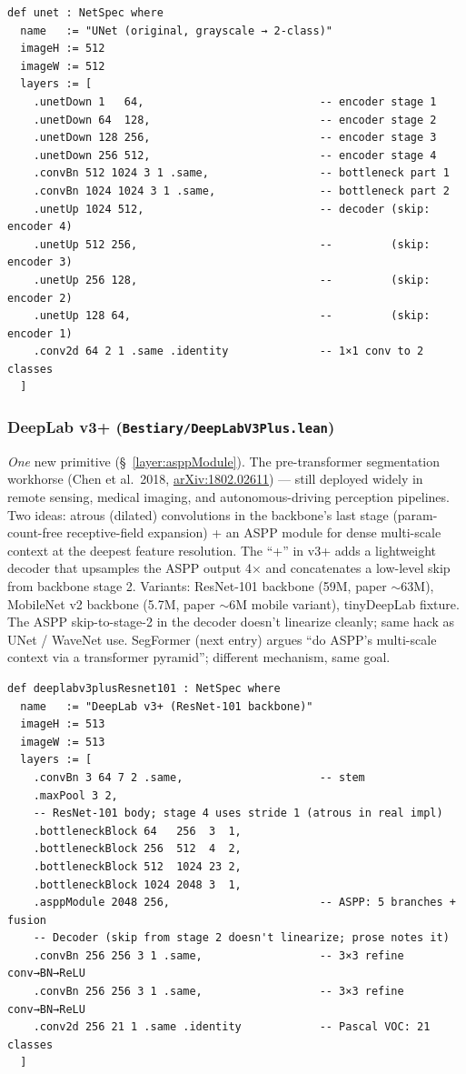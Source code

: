 \begin{verbatim}
def unet : NetSpec where
  name   := "UNet (original, grayscale → 2-class)"
  imageH := 512
  imageW := 512
  layers := [
    .unetDown 1   64,                           -- encoder stage 1
    .unetDown 64  128,                          -- encoder stage 2
    .unetDown 128 256,                          -- encoder stage 3
    .unetDown 256 512,                          -- encoder stage 4
    .convBn 512 1024 3 1 .same,                 -- bottleneck part 1
    .convBn 1024 1024 3 1 .same,                -- bottleneck part 2
    .unetUp 1024 512,                           -- decoder (skip: encoder 4)
    .unetUp 512 256,                            --         (skip: encoder 3)
    .unetUp 256 128,                            --         (skip: encoder 2)
    .unetUp 128 64,                             --         (skip: encoder 1)
    .conv2d 64 2 1 .same .identity              -- 1×1 conv to 2 classes
  ]
\end{verbatim}

\subsubsection*{DeepLab v3+ (\texttt{Bestiary/DeepLabV3Plus.lean})}
\emph{One} new primitive (\S~\ref{layer:asppModule}). The pre-transformer segmentation
workhorse (Chen et al.\ 2018,
\href{https://arxiv.org/abs/1802.02611}{arXiv:1802.02611}) --- still deployed widely in remote
sensing, medical imaging, and autonomous-driving perception
pipelines. Two ideas: atrous (dilated) convolutions in the
backbone's last stage (param-count-free receptive-field expansion)
+ an ASPP module for dense multi-scale context at the deepest
feature resolution. The ``+'' in v3+ adds a lightweight decoder that
upsamples the ASPP output 4$\times$ and concatenates a low-level skip
from backbone stage 2. Variants: ResNet-101 backbone (59M, paper
$\sim$63M), MobileNet v2 backbone (5.7M, paper $\sim$6M mobile
variant), tinyDeepLab fixture. The ASPP skip-to-stage-2 in the
decoder doesn't linearize cleanly; same hack as UNet / WaveNet use.
SegFormer (next entry) argues ``do ASPP's multi-scale context via a
transformer pyramid''; different mechanism, same goal.

\begin{verbatim}
def deeplabv3plusResnet101 : NetSpec where
  name   := "DeepLab v3+ (ResNet-101 backbone)"
  imageH := 513
  imageW := 513
  layers := [
    .convBn 3 64 7 2 .same,                     -- stem
    .maxPool 3 2,
    -- ResNet-101 body; stage 4 uses stride 1 (atrous in real impl)
    .bottleneckBlock 64   256  3  1,
    .bottleneckBlock 256  512  4  2,
    .bottleneckBlock 512  1024 23 2,
    .bottleneckBlock 1024 2048 3  1,
    .asppModule 2048 256,                       -- ASPP: 5 branches + fusion
    -- Decoder (skip from stage 2 doesn't linearize; prose notes it)
    .convBn 256 256 3 1 .same,                  -- 3×3 refine conv→BN→ReLU
    .convBn 256 256 3 1 .same,                  -- 3×3 refine conv→BN→ReLU
    .conv2d 256 21 1 .same .identity            -- Pascal VOC: 21 classes
  ]
\end{verbatim}


